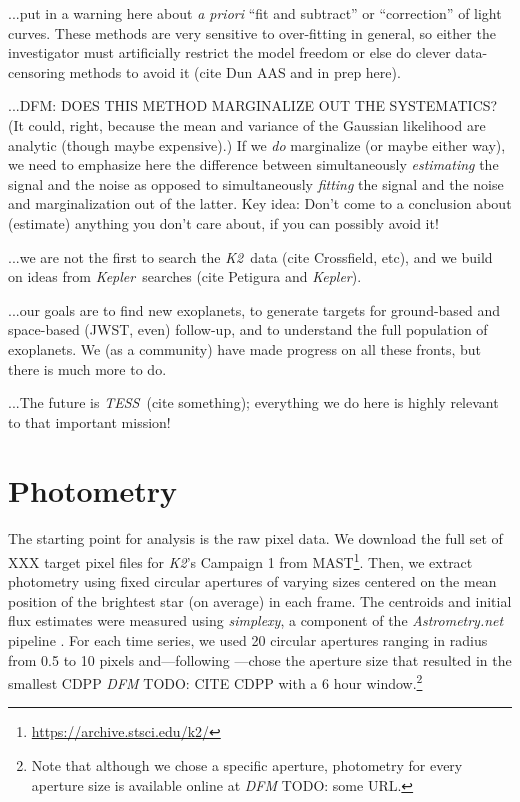 \documentclass[12pt,preprint]{aastex}
\newcommand{\project}[1]{\textsl{#1}} %
\newcommand{\kepler}{\project{Kepler}}
\newcommand{\KT}{\project{K2}}
\newcommand{\tess}{\project{TESS}}
\newcommand{\foreign}[1]{\emph{#1}}
\newcommand{\todo}[3]{{\color{#2} \emph{#1} TODO: #3}}
\newcommand{\dfmtodo}[1]{\todo{DFM}{red}{#1}}
\begin{document}
...put in a warning here about \foreign{a priori} ``fit and subtract''
or ``correction'' of light curves.  These methods are very sensitive
to over-fitting in general, so either the investigator must
artificially restrict the model freedom or else do clever
data-censoring methods to avoid it (cite Dun AAS and in prep here).

...DFM: DOES THIS METHOD MARGINALIZE OUT THE SYSTEMATICS?  (It could,
right, because the mean and variance of the Gaussian likelihood are
analytic (though maybe expensive).)  If we \emph{do} marginalize (or
maybe either way), we need to emphasize here the difference between
simultaneously \emph{estimating} the signal and the noise as opposed
to simultaneously \emph{fitting} the signal and the noise and
marginalization out of the latter.  Key idea: Don't come to a
conclusion about (estimate) anything you don't care about, if you can
possibly avoid it!

...we are not the first to search the \KT\ data (cite Crossfield, etc),
and we build on ideas from \kepler\ searches (cite Petigura and
\kepler).

...our goals are to find new exoplanets, to generate targets for
ground-based and space-based (JWST, even) follow-up, and to understand
the full population of exoplanets.  We (as a community) have made
progress on all these fronts, but there is much more to do.

...The future is \tess\ (cite something); everything we do here is
highly relevant to that important mission!

\section{Photometry}

The starting point for analysis is the raw pixel data.
We download the full set of XXX target pixel files for \KT's Campaign 1 from
MAST\footnote{\url{https://archive.stsci.edu/k2/}}.
Then, we extract photometry using fixed circular apertures of varying sizes
centered on the mean position of the brightest star (on average) in each
frame.
The centroids and initial flux estimates were measured using
\project{simplexy}, a component of the \project{Astrometry.net} pipeline
\citep{astrometry}.
For each time series, we used 20 circular apertures ranging in radius from 0.5
to 10 pixels and---following \citet{vanderberg-a}---chose the aperture size
that resulted in the smallest CDPP \dfmtodo{CITE CDPP} with a 6 hour
window.\footnote{Note that although we chose a specific aperture, photometry
for every aperture size is available online at \dfmtodo{some URL}.}
\end{document}
